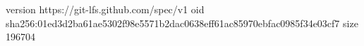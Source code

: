 version https://git-lfs.github.com/spec/v1
oid sha256:01ed3d2ba61ae5302f98e5571b2dac0638eff61ac85970ebfac0985f34e03cf7
size 196704
